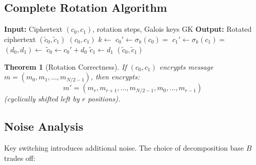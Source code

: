 \documentclass[11pt,a4paper]{article}
\newtheorem{theorem}{Theorem}
\begin{document}
\subsection{Complete Rotation Algorithm}

\begin{algorithm}[H]
\caption{Ciphertext Rotation}
\begin{algorithmic}[1]
    \State \textbf{Input:} Ciphertext $(c_0, c_1)$, rotation steps, Galois keys $\text{GK}$
    \State \textbf{Output:} Rotated ciphertext $(\tilde{c}_0, \tilde{c}_1)$
    \State
        \State \Return $(c_0, c_1)$ 
    \EndIf
    \State
    \State {}
    \State $k \gets$ 
    \State
    \State {}
    \State $c_0' \gets \sigma_k(c_0) = $ 
    \State $c_1' \gets \sigma_k(c_1) = $ 
    \State
    \State {}
    \State $(d_0, d_1) \gets$ 
    \State
    \State {}
    \State $\tilde{c}_0 \gets c_0' + d_0$
    \State $\tilde{c}_1 \gets d_1$
    \State
    \State \Return $(\tilde{c}_0, \tilde{c}_1)$
\EndFunction
\end{algorithmic}
\end{algorithm}

\begin{theorem}[Rotation Correctness]
If $(c_0, c_1)$ encrypts message $m = (m_0, m_1, \ldots, m_{N/2-1})$, then  encrypts:
\[
m' = (m_r, m_{r+1}, \ldots, m_{N/2-1}, m_0, \ldots, m_{r-1})
\]
(cyclically shifted left by $r$ positions).
\end{theorem}

\subsection{Noise Analysis}

Key switching introduces additional noise. The choice of decomposition base $B$ trades off:
\end{document}
